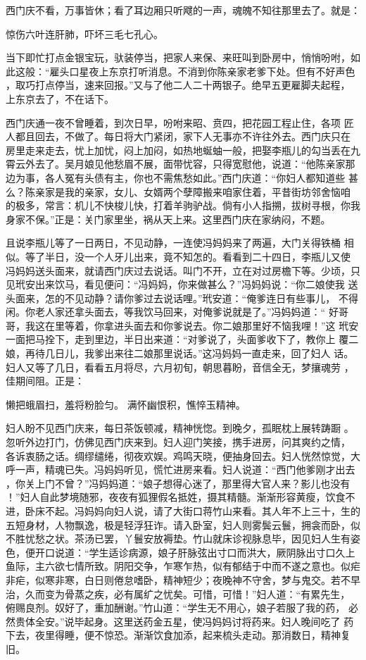 西门庆不看，万事皆休；看了耳边厢只听飕的一声，魂魄不知往那里去了。就是：

惊伤六叶连肝肺，吓坏三毛七孔心。

当下即忙打点金银宝玩，驮装停当，把家人来保、来旺叫到卧房中，悄悄吩咐，如
此这般：“雇头口星夜上东京打听消息。不消到你陈亲家老爹下处。但有不好声色
，取巧打点停当，速来回报。”又与了他二人二十两银子。绝早五更雇脚夫起程，
上东京去了，不在话下。

西门庆通一夜不曾睡着，到次日早，吩咐来昭、贲四，把花园工程止住，各项
匠人都且回去，不做了。每日将大门紧闭，家下人无事亦不许往外去。西门庆只在
房里走来走去，忧上加忧，闷上加闷，如热地蜒蚰一般，把娶李瓶儿的勾当丢在九
霄云外去了。吴月娘见他愁眉不展，面带忧容，只得宽慰他，说道：“他陈亲家那
边为事，各人冤有头债有主，你也不需焦愁如此。”西门庆道：“你妇人都知道些
甚么？陈亲家是我的亲家，女儿、女婿两个孽障搬来咱家住着，平昔街坊邻舍恼咱
的极多，常言：机儿不快梭儿快，打着羊驹驴战。倘有小人指搠，拔树寻根，你我
身家不保。”正是：关门家里坐，祸从天上来。这里西门庆在家纳闷，不题。

且说李瓶儿等了一日两日，不见动静，一连使冯妈妈来了两遍，大门关得铁桶
相似。等了半日，没一个人牙儿出来，竟不知怎的。看看到二十四日，李瓶儿又使
冯妈妈送头面来，就请西门庆过去说话。叫门不开，立在对过房檐下等。少顷，只
见玳安出来饮马，看见便问：“冯妈妈，你来做甚么？”冯妈妈说：“你二娘使我
送头面来，怎的不见动静？请你爹过去说话哩。”玳安道：“俺爹连日有些事儿，
不得闲。你老人家还拿头面去，等我饮马回来，对俺爹说就是了。”冯妈妈道：“
好哥哥，我这在里等着，你拿进头面去和你爹说去。你二娘那里好不恼我哩！”这
玳安一面把马拴下，走到里边，半日出来道：“对爹说了，头面爹收下了，教你上
覆二娘，再待几日儿，我爹出来往二娘那里说话。”这冯妈妈一直走来，回了妇人
话。妇人又等了几日，看看五月将尽，六月初旬，朝思暮盼，音信全无，梦攘魂劳
，佳期间阻。正是：

懒把蛾眉扫，羞将粉脸匀。
满怀幽恨积，憔悴玉精神。

妇人盼不见西门庆来，每日茶饭顿减，精神恍惚。到晚夕，孤眠枕上展转踌蹰
。忽听外边打门，仿佛见西门庆来到。妇人迎门笑接，携手进房，问其爽约之情，
各诉衷肠之话。绸缪缱绻，彻夜欢娱。鸡鸣天晓，便抽身回去。妇人恍然惊觉，大
呼一声，精魂已失。冯妈妈听见，慌忙进房来看。妇人说道：“西门他爹刚才出去
，你关上门不曾？”冯妈妈道：“娘子想得心迷了，那里得大官人来？影儿也没有
！”妇人自此梦境随邪，夜夜有狐狸假名抵姓，摄其精髓。渐渐形容黄瘦，饮食不
进，卧床不起。冯妈妈向妇人说，请了大街口蒋竹山来看。其人年不上三十，生的
五短身材，人物飘逸，极是轻浮狂诈。请入卧室，妇人则雾鬓云鬟，拥衾而卧，似
不胜忧愁之状。茶汤已罢，丫鬟安放褥垫。竹山就床诊视脉息毕，因见妇人生有姿
色，便开口说道：“学生适诊病源，娘子肝脉弦出寸口而洪大，厥阴脉出寸口久上
鱼际，主六欲七情所致。阴阳交争，乍寒乍热，似有郁结于中而不遂之意也。似疟
非疟，似寒非寒，白日则倦怠嗜卧，精神短少；夜晚神不守舍，梦与鬼交。若不早
治，久而变为骨蒸之疾，必有属纩之忧矣。可惜，可惜！”妇人道：“有累先生，
俯赐良剂。奴好了，重加酬谢。”竹山道：“学生无不用心，娘子若服了我的药，
必然贵体全安。”说毕起身。这里送药金五星，使冯妈妈讨将药来。妇人晚间吃了
药下去，夜里得睡，便不惊恐。渐渐饮食加添，起来梳头走动。那消数日，精神复
旧。

